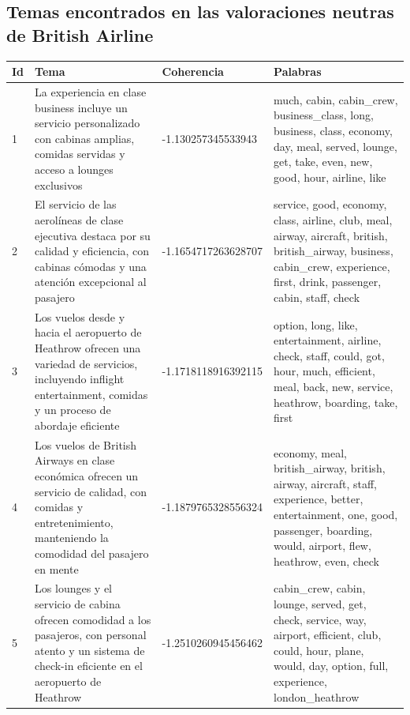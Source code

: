 \documentclass{report}
\begin{document}
            \clearpage\subsection{Temas encontrados en las valoraciones neutras de British Airline}
                \label{tab:temas_british_airline_neutras}
                \begin{longtable}{|p{1cm}|p{4cm}|p{4cm}|p{6cm}|}
                    \hline
                    \textbf{Id} & \textbf{Tema} & \textbf{Coherencia} & \textbf{Palabras} \\
                    \hline
                    1 & La experiencia en clase business incluye un servicio personalizado con cabinas amplias, comidas servidas y acceso a lounges exclusivos & -1.130257345533943 & much, cabin, cabin\_crew, business\_class, long, business, class, economy, day, meal, served, lounge, get, take, even, new, good, hour, airline, like \\
                    \hline
                    2 & El servicio de las aerolíneas de clase ejecutiva destaca por su calidad y eficiencia, con cabinas cómodas y una atención excepcional al pasajero & -1.1654717263628707 & service, good, economy, class, airline, club, meal, airway, aircraft, british, british\_airway, business, cabin\_crew, experience, first, drink, passenger, cabin, staff, check \\
                    \hline
                    3 & Los vuelos desde y hacia el aeropuerto de Heathrow ofrecen una variedad de servicios, incluyendo inflight entertainment, comidas y un proceso de abordaje eficiente & -1.1718118916392115 & option, long, like, entertainment, airline, check, staff, could, got, hour, much, efficient, meal, back, new, service, heathrow, boarding, take, first \\
                    \hline
                    4 & Los vuelos de British Airways en clase económica ofrecen un servicio de calidad, con comidas y entretenimiento, manteniendo la comodidad del pasajero en mente & -1.1879765328556324 & economy, meal, british\_airway, british, airway, aircraft, staff, experience, better, entertainment, one, good, passenger, boarding, would, airport, flew, heathrow, even, check \\
                    \hline
                    5 & Los lounges y el servicio de cabina ofrecen comodidad a los pasajeros, con personal atento y un sistema de check-in eficiente en el aeropuerto de Heathrow & -1.2510260945456462 & cabin\_crew, cabin, lounge, served, get, check, service, way, airport, efficient, club, could, hour, plane, would, day, option, full, experience, london\_heathrow \\

\end{longtable}
\end{document}
